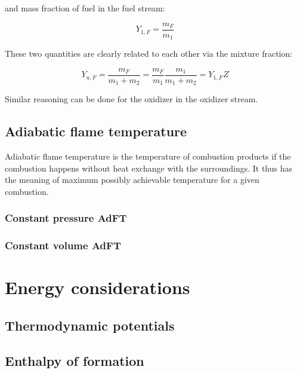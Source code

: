 \documentclass[10pt,twocolumn]{article}
\begin{document}
and mass fraction of fuel in the fuel stream:

\begin{equation}
Y_{1, F} = \frac{m_F}{m_1}
\end{equation}

These two quantities are clearly related to each other via the mixture fraction:

\begin{equation}
Y_{u, F} = \frac{m_F}{m_1 + m_2} = \frac{m_F}{m_1} \frac{m_1}{m_1 + m_2} = Y_{1, F} Z
\end{equation}

Similar reasoning can be done for the oxidizer in the oxidizer stream.

\subsection{Adiabatic flame temperature}

Adiabatic flame temperature is the temperature of combustion products if the combustion happens without heat exchange with the surroundings. It thus has the meaning of maximum possibly achievable temperature for a given combustion.

\subsubsection{Constant pressure AdFT}



\subsubsection{Constant volume AdFT}











\section{Energy considerations}


\subsection{Thermodynamic potentials}





\subsection{Enthalpy of formation}
\end{document}
